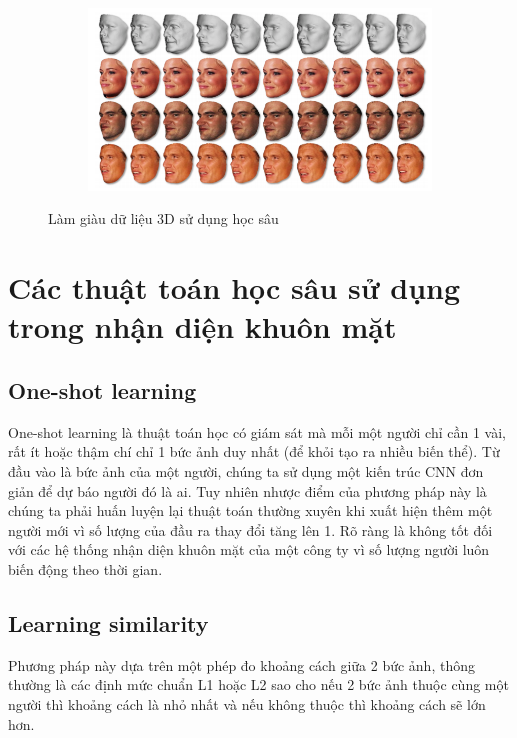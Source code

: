 \begin{figure}
    \begin{subfigure}{1.\textwidth}
        \begin{center}
            \includegraphics[width=1.\linewidth]{Chapters/items/chap3_6.jpg}
        \end{center}
        \label{fig:chap3_6}
    \end{subfigure}
    \caption{Làm giàu dữ liệu 3D sử dụng học sâu}
\end{figure}


\newpage
\section{Các thuật toán học sâu sử dụng trong nhận diện khuôn mặt}
\subsection{One-shot learning}

One-shot learning là thuật toán học có giám sát mà mỗi một người chỉ cần 1 vài,
rất ít hoặc thậm chí chỉ 1 bức ảnh duy nhất (để khỏi tạo ra nhiều biến thể).
Từ đầu vào là bức ảnh của một người, chúng ta sử dụng một kiến trúc CNN
đơn giản để dự báo người đó là ai.
Tuy nhiên nhược điểm của phương pháp này là chúng ta phải huấn luyện lại thuật
toán thường xuyên khi xuất hiện thêm một người mới vì số lượng của đầu ra thay đổi tăng lên 1.
Rõ ràng là không tốt đối với các hệ thống nhận diện khuôn mặt của một công ty vì số lượng người luôn biến động theo thời gian.

\subsection{Learning similarity}

Phương pháp này dựa trên một phép đo khoảng cách giữa 2 bức ảnh, thông thường là các định
mức chuẩn L1 hoặc L2 sao cho nếu 2 bức ảnh thuộc cùng một người thì khoảng cách là
nhỏ nhất và nếu không thuộc thì khoảng cách sẽ lớn hơn.


